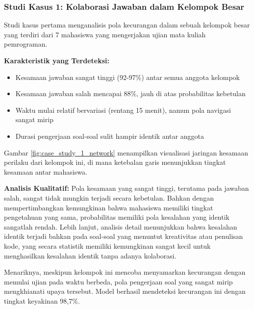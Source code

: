 \subsubsection{Studi Kasus 1: Kolaborasi Jawaban dalam Kelompok Besar}

Studi kasus pertama menganalisis pola kecurangan dalam sebuah kelompok besar yang terdiri dari 7 mahasiswa yang mengerjakan ujian mata kuliah pemrograman.

\textbf{Karakteristik yang Terdeteksi:}
\begin{itemize}
    \item Kesamaan jawaban sangat tinggi (92-97\%) antar semua anggota kelompok
    \item Kesamaan jawaban salah mencapai 88\%, jauh di atas probabilitas kebetulan
    \item Waktu mulai relatif bervariasi (rentang 15 menit), namun pola navigasi sangat mirip
    \item Durasi pengerjaan soal-soal sulit hampir identik antar anggota
\end{itemize}

Gambar \ref{fig:case_study_1_network} menampilkan visualisasi jaringan kesamaan perilaku dari kelompok ini, di mana ketebalan garis menunjukkan tingkat kesamaan antar mahasiswa.


\textbf{Analisis Kualitatif:}
Pola kesamaan yang sangat tinggi, terutama pada jawaban salah, sangat tidak mungkin terjadi secara kebetulan. Bahkan dengan mempertimbangkan kemungkinan bahwa mahasiswa memiliki tingkat pengetahuan yang sama, probabilitas memiliki pola kesalahan yang identik sangatlah rendah. Lebih lanjut, analisis detail menunjukkan bahwa kesalahan identik terjadi bahkan pada soal-soal yang menuntut kreativitas atau penulisan kode, yang secara statistik memiliki kemungkinan sangat kecil untuk menghasilkan kesalahan identik tanpa adanya kolaborasi.

Menariknya, meskipun kelompok ini mencoba menyamarkan kecurangan dengan memulai ujian pada waktu berbeda, pola pengerjaan soal yang sangat mirip mengkhianati upaya tersebut. Model berhasil mendeteksi kecurangan ini dengan tingkat keyakinan 98,7\%.

